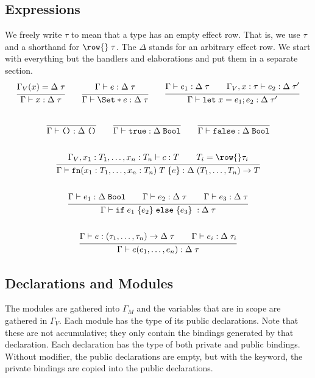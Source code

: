 \subsection{Expressions}
We freely write $\tau$ to mean that a type has an empty effect row. That is, we use $\tau$ and a shorthand for $\row{}\;\tau$. The $\Delta$ stands for an arbitrary effect row. We start with everything but the handlers and elaborations and put them in a separate section.
\begin{gather*}
    \infer{
        \Gamma \vdash x : \Delta\;\tau
    }{
        \Gamma_V(x) = \Delta\;\tau
    }
    \qquad
    \infer{
        \Gamma \vdash \S{e} : \Delta\;\tau
    }{
        \Gamma \vdash e : \Delta\;\tau
    }
    \qquad
    \infer{
        \Gamma \vdash \kw{let}\;x = e_1; e_2 : \Delta\;\tau'
    }{
        \Gamma \vdash e_1 : \Delta\;\tau
        \qquad
        \Gamma_V, x: \tau \vdash e_2 : \Delta\;\tau'
    }
    \\\\
    \infer{
        \Gamma \vdash \unit: \Delta\;\unit
    }{}
    \qquad
    \infer{\Gamma \vdash \true : \Delta\;\Bool}{}
    \qquad
    \infer{\Gamma \vdash \false : \Delta\;\Bool}{}
    \\\\
    \infer{
        \Gamma \vdash \fn(x_1: T_1,\dots,x_n: T_n)\;T\; \{e\}: \Delta\;(T_1,\dots, T_n) \to T
    }{
        \Gamma_V, x_1: T_1, \dots, x_n: T_n \vdash c : T
        \qquad
        T_i = \row{} \tau_i
    }
    \\\\
    \infer{
        \Gamma \vdash \cond{e_1}{e_2}{e_3} : \Delta\;\tau
    }{
        \Gamma \vdash e_1 : \Delta\;\Bool
        \qquad
        \Gamma \vdash e_2 : \Delta\;\tau
        \qquad
        \Gamma \vdash e_3 : \Delta\;\tau
    }
    \\\\
    \infer{
        \Gamma \vdash e(e_1, \dots, e_n): \Delta\;\tau
    }{
        \Gamma \vdash e: (\tau_1, \dots, \tau_n) \to \Delta\;\tau
        \qquad
        \Gamma \vdash e_i : \Delta\;\tau_i
    }
\end{gather*}

\subsection{Declarations and Modules}

The modules are gathered into $\Gamma_M$ and the variables that are in scope are gathered in $\Gamma_V$. Each module has the type of its public declarations. Note that these are not accumulative; they only contain the bindings generated by that declaration. Each declaration has the type of both private and public bindings. Without modifier, the public declarations are empty, but with the  keyword, the private bindings are copied into the public declarations. 

